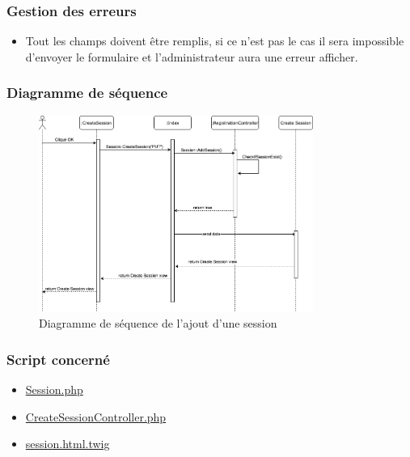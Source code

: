 \newpage
\subsubsection{Gestion des erreurs}
	\begin{itemize}
		\item Tout les champs doivent être remplis, si ce n'est pas le cas il sera impossible d'envoyer le formulaire et l'administrateur aura une erreur afficher.
	\end{itemize}

\vspace{\baselineskip}
\subsubsection{Diagramme de séquence}
	\begin{figure}[h]
		\includegraphics[width=0.8\textwidth,center]{Diagramme/sequence-us11}
		\caption{Diagramme de séquence de l'ajout d'une session}
	\end{figure}

\vspace{\baselineskip}
\subsubsection{Script concerné}
	\begin{itemize}
		\item \href{https://github.com/victorsmits/Aquabike/blob/master/Symfony-Twig/src/Entity/Session.php}{Session.php}
		\item \href{https://github.com/victorsmits/Aquabike/blob/master/Symfony-Twig/src/Controller/CreateSessionController.php}{CreateSessionController.php}
		\item \href{https://github.com/victorsmits/Aquabike/blob/master/Symfony-Twig/templates/create_session/session.html.twig}{session.html.twig}
	\end{itemize}